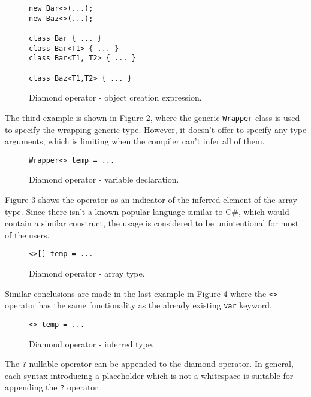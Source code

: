 \begin{figure}[h]
\begin{lstlisting}[style=csharp]
new Bar<>(...);
new Baz<>(...);

class Bar { ... }
class Bar<T1> { ... }
class Bar<T1, T2> { ... }

class Baz<T1,T2> { ... }
\end{lstlisting}
\caption{Diamond operator - object creation expression.}
\label{img41:opDi2}
\end{figure}
\par
The third example is shown in Figure \ref{img42:opDi3}, where the generic \texttt{Wrapper} class is used to specify the wrapping generic type. 
However, it doesn’t offer to specify any type arguments, which is limiting when the compiler can’t infer all of them.
\begin{figure}[h]
\begin{lstlisting}[style=csharp]
Wrapper<> temp = ...
\end{lstlisting}
\caption{Diamond operator - variable declaration.}
\label{img42:opDi3}
\end{figure}
\par
Figure \ref{img43:opDi4} shows the operator as an indicator of the inferred element of the array type. 
Since there isn’t a known popular language similar to C\#, which would contain a similar construct, the usage is considered to be unintentional for most of the users.
\begin{figure}[h]
\begin{lstlisting}[style=csharp]
<>[] temp = ...
\end{lstlisting}
\caption{Diamond operator - array type.}
\label{img43:opDi4}
\end{figure}
\par
Similar conclusions are made in the last example in Figure \ref{img44:opDi5} where the \texttt{<>} operator has the same functionality as the already existing \texttt{var} keyword.
\begin{figure}[h!]
\begin{lstlisting}[style=csharp]
<> temp = ...
\end{lstlisting}
\caption{Diamond operator - inferred type.}
\label{img44:opDi5}
\end{figure}
\par
The \texttt{?} nullable operator can be appended to the diamond operator.
In general, each syntax introducing a placeholder which is not a whitespace is suitable for appending the \texttt{?} operator.

